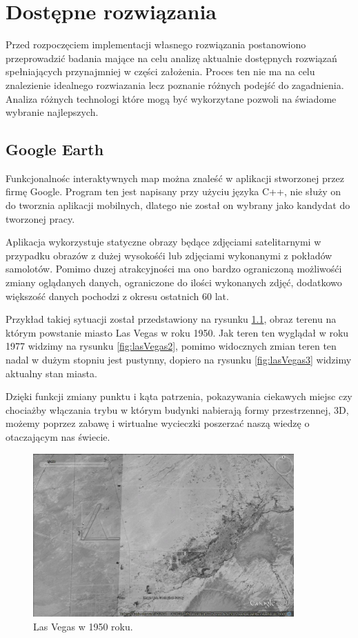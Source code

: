 ﻿\chapter{Dostępne rozwiązania}
\label{sec:dostepnerozwiazania}

Przed rozpoczęciem implementacji własnego rozwiązania postanowiono przeprowadzić badania mające na celu analizę aktualnie dostępnych rozwiązań spełniających przynajmniej w części założenia. Proces ten nie ma na celu znalezienie idealnego rozwiazania lecz poznanie różnych podejść do zagadnienia. Analiza różnych technologi które mogą być wykorzytane pozwoli na świadome wybranie najlepszych.


\section{Google Earth}
\label{sec:Google Earth}

Funkcjonalnośc interaktywnych map można znaleść w aplikacji stworzonej przez firmę Google. Program ten jest napisany przy użyciu języka C++, nie służy on do tworznia aplikacji mobilnych, dlatego nie został on wybrany jako kandydat do tworzonej pracy.

Aplikacja wykorzystuje statyczne obrazy będące zdjęciami satelitarnymi w przypadku obrazów z dużej wysokośći lub zdjęciami wykonanymi z pokładów samolotów. Pomimo duzej atrakcyjności ma ono bardzo ograniczoną możliwośći zmiany oglądanych danych, ograniczone do ilości wykonanych zdjęć, dodatkowo większość danych pochodzi z okresu ostatnich 60 lat.

Przykład takiej sytuacji został przedstawiony na rysunku \ref{fig:lasVegas1}, obraz terenu na którym powstanie miasto Las Vegas w roku 1950. Jak teren ten wyglądał w roku 1977 widzimy na rysunku \ref{fig:lasVegas2}, pomimo widocznych zmian teren ten nadal w dużym stopniu jest pustynny, dopiero na rysunku \ref{fig:lasVegas3} widzimy aktualny stan miasta.

Dzięki funkcji zmiany punktu i kąta patrzenia, pokazywania ciekawych miejsc czy chociażby włączania trybu w którym budynki nabierają formy przestrzennej, 3D, możemy poprzez zabawę i wirtualne wycieczki poszerzać naszą wiedzę o otaczającym nas świecie.


\begin{figure}[H]
  \centering
    \includegraphics[width=100mm]{ge/01_1950.jpg}
  \caption{Las Vegas w 1950 roku.}
  \label{fig:lasVegas1}
\end{figure}

